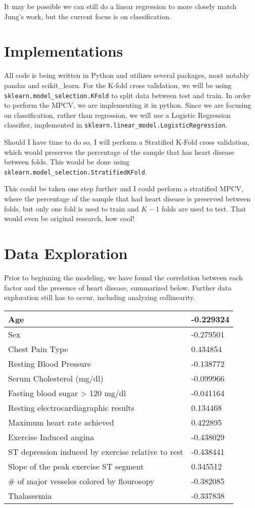 \documentclass[letter]{article}
\def\code#1{\texttt{#1}}
\begin{document}
It may be possible we can still do a linear regression to more closely match Jung's work, but the current focus is on classification.
\section{Implementations}
All code is being written in Python and utilizes several packages, most notably pandas and scikit\_learn.  For the K-fold cross validation, we will be using \code{sklearn.model\_selection.KFold} to split data between test and train.  In order to perform the MPCV, we are implementing it in python.  Since we are focusing on classification, rather than regression, we will use a Logistic Regression classifier, implemented in  \code{sklearn.linear\_model.LogisticRegression}.

Should I have time to do so, I will perform a Stratified K-Fold cross validation, which would preserves the percentage of the sample that has heart disease between folds.  This would be done using \code{sklearn.model\_selection.StratifiedKFold}.

This could be taken one step further and I could perform a stratified MPCV, where the percentage of the sample that had heart disease is preserved between folds, but only one fold is used to train and \(K-1\) folds are used to test.  That would even be original research, how cool!

\section{Data Exploration}
Prior to beginning the modeling, we have found the correlation between each factor and the presence of heart disease, summarized below.  Further data exploration still has to occur, including analyzing collinearity.
\begin{center}
	\begin{tabular}{ | m{8em} | m{5em}| } 
		\hline
		Age & -0.229324 \\ 
		\hline
		Sex & -0.279501 \\ 
		\hline
		Chest Pain Type & 0.434854 \\ 
		\hline
		Resting Blood Pressure & -0.138772 \\ 
		\hline
		Serum Cholesterol (mg/dl) & -0.099966 \\ 
		\hline
		Fasting blood sugar > 120 mg/dl & -0.041164 \\ 
		\hline
		Resting electrocardiagraphic results & 0.134468 \\ 
		\hline
		Maximum heart rate achieved & 0.422895 \\ 
		\hline
		Exercise Induced angina & -0.438029 \\ 
		\hline
		ST depression induced by exercise relative to rest & -0.438441 \\ 
		\hline
		Slope of the peak exercise ST segment & 0.345512 \\ 
		\hline
		\# of major vesseles colored by flourosopy & -0.382085 \\ 
		\hline
		Thalassemia  & -0.337838 \\ 
		\hline
	\end{tabular}
\end{center}


\end{document}
